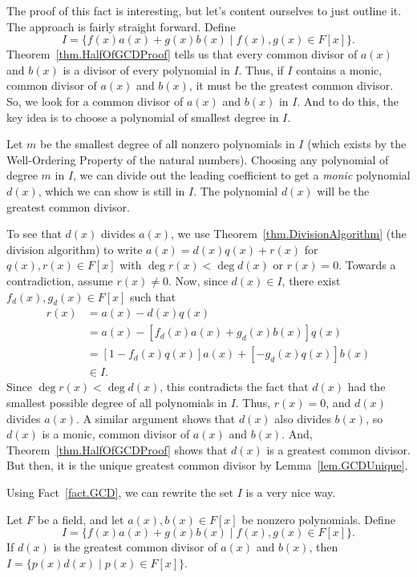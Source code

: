 The proof of this fact is interesting, but let's content ourselves to just outline it. The approach is fairly straight forward. Define \[I = \{f(x)a(x) + g(x)b(x)\mid f(x),g(x)\in F[x]\}.\]  Theorem~\ref{thm.HalfOfGCDProof} tells us that every common divisor of $a(x)$ and $b(x)$ is a divisor of every polynomial in $I$. Thus, if $I$ contains a monic, common divisor of $a(x)$ and $b(x)$, it must be the greatest common divisor. So, we look for a common divisor of $a(x)$ and $b(x)$ in $I$. And to do this, the key idea is to choose a polynomial of smallest degree in $I$.

Let $m$ be the smallest degree of all nonzero polynomials in $I$  (which exists by the Well-Ordering Property of the natural numbers). Choosing any polynomial of degree $m$ in $I$, we can divide out the leading coefficient to get a \emph{monic} polynomial $d(x)$, which we can show is still in $I$. The polynomial $d(x)$ will be the greatest common divisor.

To see that $d(x)$ divides $a(x)$, we use Theorem~\ref{thm.DivisionAlgorithm} (the division algorithm) to write $a(x) = d(x)q(x) + r(x)$ for $q(x),r(x)\in F[x]$ with $\deg r(x) < \deg d(x)$ or $r(x) = 0$. Towards a contradiction, assume $r(x) \neq 0$. Now, since $d(x)\in I$, there exist $f_d(x),g_d(x)\in F[x]$ such that
\begin{align*}
r(x) & = a(x) - d(x)q(x)\\
& = a(x) - [f_d(x)a(x) + g_d(x)b(x)]q(x)\\
& = [1-f_d(x)q(x)]a(x) + [-g_d(x)q(x)]b(x)\\
&\in I.
\end{align*}
Since $\deg r(x) < \deg d(x)$, this contradicts the fact that $d(x)$ had the smallest possible degree of all polynomials in $I$. Thus, $r(x) = 0$, and $d(x)$ divides $a(x)$. A similar argument shows that $d(x)$ also divides $b(x)$, so $d(x)$ is a monic, common divisor of $a(x)$ and $b(x)$. And, Theorem~\ref{thm.HalfOfGCDProof} shows that $d(x)$ is a greatest common divisor. But then, it is the unique greatest common divisor by Lemma~\ref{lem.GCDUnique}.

Using Fact~\ref{fact.GCD}, we can rewrite the set $I$ is a very nice way.

\begin{corollary}
Let $F$ be a field, and let $a(x), b(x)\in F[x]$ be nonzero polynomials. Define \[I = \{f(x)a(x) + g(x)b(x)\mid f(x),g(x)\in F[x]\}.\]
If $d(x)$ is the greatest common divisor of $a(x)$ and $b(x)$, then $I = \{p(x)d(x)\mid p(x)\in F[x]\}$.
\end{corollary}

